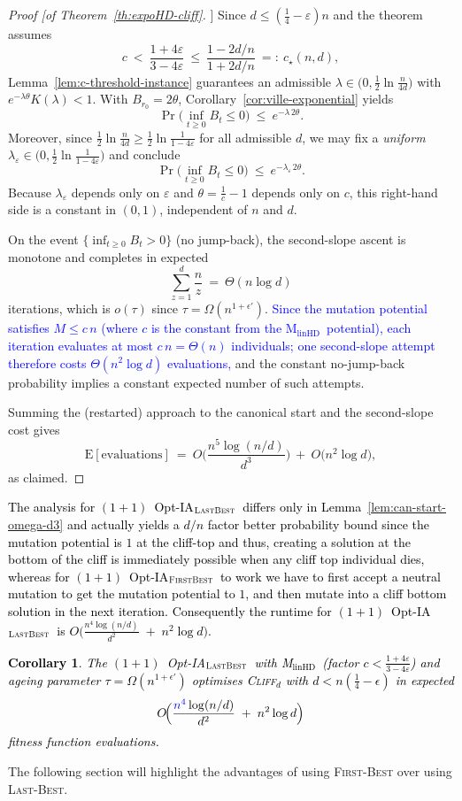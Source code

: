 \documentclass[lettersize,journal]{IEEEtran}
\newcommand{\new}[1]{\textcolor{black}{#1}}
\newcommand{\rev}[1]{\textcolor{blue}{#1}}
\newcommand{\EE}{\text{E}}
\newcommand{\cliff}{\textsc{Cliff}$_d$}
\newcommand{\linHD}{M$_{\text{linHD}}$}
\newcommand{\firstBest}{$(1+1)$~Opt-IA$_{\textsc{FirstBest}}$}
\newcommand{\lastBest}{$(1+1)$~Opt-IA$_{\textsc{LastBest}}$}
\newtheorem{corollary}{Corollary}
\begin{document}
{\begin{proof}[Proof [of Theorem~\ref{th:expoHD-cliff}]]
	Since $d\le(\tfrac14-\varepsilon)n$ and the theorem assumes
	\[
	c\ <\ \frac{1+4\varepsilon}{3-4\varepsilon}\ \le\ \frac{1-2d/n}{1+2d/n}\ =:\ c_\star(n,d),
	\]
	Lemma~\ref{lem:c-threshold-instance} guarantees an admissible $\lambda\in\big(0,\tfrac12\ln\tfrac{n}{4d}\big)$ with $e^{-\lambda\theta}K(\lambda)<1$.
	With $B_{r_0}=2\theta$, Corollary~\ref{cor:ville-exponential} yields
	\[
	\Pr\!\Big(\inf_{t\ge 0} B_t\le 0\Big)\ \le\ e^{-\lambda\,2\theta}.
	\]
	Moreover, since $\tfrac12\ln\!\tfrac{n}{4d}\ge \tfrac12\ln\!\tfrac{1}{1-4\varepsilon}$ for all admissible $d$, we may fix a \emph{uniform} $\lambda_\varepsilon\in\big(0,\tfrac12\ln\tfrac{1}{1-4\varepsilon}\big)$ and conclude
	\[
	\Pr\!\Big(\inf_{t\ge 0} B_t\le 0\Big)\ \le\ e^{-\lambda_\varepsilon\,2\theta}.
	\]
	Because $\lambda_\varepsilon$ depends only on $\varepsilon$ and $\theta=\tfrac1c-1$ depends only on $c$, this right-hand side is a constant in $(0,1)$, independent of $n$ and $d$.
	
	\smallskip
	On the event $\{\inf_{t\ge 0} B_t>0\}$ (no jump-back), the second-slope ascent is monotone and completes in expected
	\[
	\sum_{z=1}^{d}\frac{n}{z}\ =\ \Theta(n\log d)
	\]
	iterations, which is $o(\tau)$ since $\tau=\Omega(n^{1+\epsilon'})$. \textcolor{blue}{Since the mutation potential satisfies $M \le c\,n$ (where $c$ is the constant
	from the \linHD\ potential), each iteration evaluates at most $c\,n =\Theta(n)$
	individuals; one second-slope attempt therefore costs $\Theta(n^{2}\log d)$
	evaluations,} and the constant no-jump-back probability implies a constant expected number of such attempts.
	
	\smallskip

	Summing the (restarted) approach to the canonical start and the second-slope cost gives
	\[
	\EE[\text{evaluations}]
	\ =\ O\!\Big(\frac{n^{5}\log(n/d)}{d^{3}}\Big)\ +\ O\!\big(n^{2}\log d\big),
	\]
	as claimed.
\end{proof}

\textcolor{black}{The analysis for \lastBest~differs only in Lemma~\ref{lem:can-start-omega-d3} and actually yields a $d/n$ factor better probability bound since the mutation potential is $1$ at the cliff-top and thus, creating a solution at the bottom of the cliff is immediately possible when any cliff top individual dies, whereas for \firstBest~to work we have to first accept a neutral mutation to get the mutation potential to $1$, and then mutate into a cliff bottom solution in the next iteration. Consequently the runtime for \lastBest~is  
$O\!\Big(\frac{n^{4}\log(n/d)}{d^{2}} \;+\; n^{2}\log d\Big)$.}

\textcolor{black}{
\begin{corollary}
	The \textcolor{black}{\lastBest~with} \linHD\ \new{(factor $c<\tfrac{1+4\varepsilon}{3-4\varepsilon}$)} and ageing parameter $\tau=\Omega(n^{1+\epsilon'})$
	optimises \cliff{} with $d<n(\tfrac{1}{4}-\epsilon)$ in expected
	\[
	O\!\Big(\frac{\rev{n^{4}}\log(n/d)}{d^{2}} \;+\; n^{2}\log d\Big)
	\]
	fitness function evaluations.
\end{corollary}
}
The following section will highlight the advantages of using \textsc{First-Best} over using \textsc{Last-Best}.
 }
 
\end{document}
